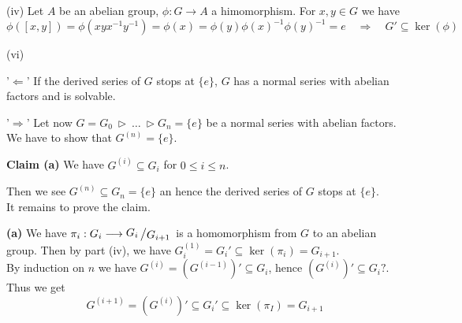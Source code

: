\documentclass[12pt]{book}
\newcommand{\slant}[2]{{\raisebox{.1em}{$#1$}\left/\raisebox{-.1em}{$#2$}\right.}}
\begin{document}
\begin{spacing}{1.3}
\begin{compactenum}
\item[(iv)] Let $A$ be an abelian group, $\phi:G \longrightarrow A$ a himomorphism. For $x,y \in G$ we have
$$\phi([x,y])=\phi(xyx^{-1}y^{-1})=\phi(x)=\phi(y)\phi(x)^{-1}\phi(y)^{-1}=e \quad \Longrightarrow \quad G' \subseteq \ker(\phi)$$
\item[(vi)] \begin{compactitem}
\item['$\Leftarrow$'] If the derived series of $G$ stops at $\{e\}$, $G$ has a normal series with abelian factors and is solvable.
\item['$\Rightarrow$'] Let now $G=G_0 \ \triangleright \ \ldots \ \triangleright G_n=\{e\}$ be a normal series with abelian factors. We have to show that $G^{(n)}=\{e\}$.
\begin{compactenum}
\item[\textbf{Claim (a)}] We have $G^{(i)} \subseteq G_i$ for $0 \leqslant i \leqslant n$.
\end{compactenum}
Then we see $G^{(n)} \subseteq G_n = \{e\}$ an hence the derived series of $G$ stops at $\{e\}$.\\ It remains to prove the claim.
\begin{compactenum}
\item[\textbf{(a)}] We have $\pi_i:G_i \longrightarrow \slant{G_i}{G_{i+1}}$ is a homomorphism from $G$ to an abelian group. Then by part (iv), we have $G_i^{(1)}=G_i' \subseteq \ker(\pi_i)=G_{i+1}$.\\
By induction on $n$ we have $G^{(i)}=(G^{(i-1)})' \subseteq G_i$, hence $\left(G^{(i)}\right)' \subseteq G_i?$.\\
Thus we get 
$$G^{(i+1)} = \left(G^{(i)}\right)' \subseteq G_i' \subseteq \ker(\pi_I) = G_{i+1}$$
\end{compactenum}
\end{compactitem}
\end{compactenum}


\end{spacing}
\end{document}

